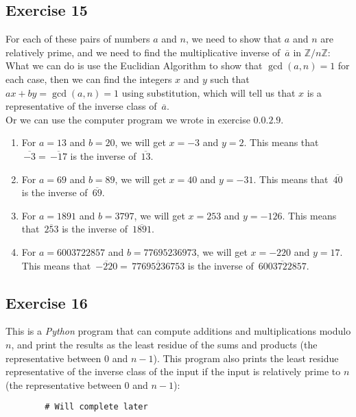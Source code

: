 \documentclass[12pt]{article}
\newcommand{\Z}{\mathbb{Z}}
\newcommand{\olsi}[1]{\,\overline{{#1}}}
\begin{document}
    \subsection*{Exercise 15}
    For each of these pairs of numbers $a$ and $n$,
    we need to show that $a$ and $n$ are relatively prime,
    and we need to find the multiplicative inverse of $\olsi{a}$
    in $\Z/n\Z$: \\
    What we can do is use the Euclidian Algorithm
    to show that $\gcd(a, n) = 1$ for each case,
    then we can find the integers $x$ and $y$
    such that $ax + by = \gcd(a, n) = 1$ using substitution,
    which will tell us that $x$ is a representative of
    the inverse class of $\olsi{a}$. \\
    Or we can use the computer program we wrote in exercise $0.0.2.9$. \\ 
    \begin{enumerate}[label=\textbf{\alph*.}]
        \item 
            For $a = 13$ and $b = 20$,
            we will get $x = -3$ and $y = 2$.
            This means that $\olsi{-3} = \olsi{-17}$
            is the inverse of $\olsi{13}$.
        \item 
            For $a = 69$ and $b = 89$,
            we will get $x = 40$ and $y = -31$.
            This means that $\olsi{40}$
            is the inverse of $\olsi{69}$.
        \item 
            For $a = 1891$ and $b = 3797$,
            we will get $x = 253$ and $y = -126$.
            This means that $\olsi{253}$
            is the inverse of $\olsi{1891}$.
        \item 
            For $a = 6003722857$ and $b = 77695236973$,
            we will get $x = -220$ and $y = 17$.
            This means that $\olsi{-220} = \olsi{77695236753}$
            is the inverse of $\olsi{6003722857}$.
    \end{enumerate}
 
    \subsection*{Exercise 16}
    This is a \textit{Python} program that can compute
    additions and multiplications modulo $n$,
    and print the results as the least residue of
    the sums and products (the representative between $0$ and $n-1$).
    This program also prints the least residue representative
    of the inverse class of the input if the input is relatively
    prime to $n$ (the representative between $0$ and $n-1$):
    \begin{lstlisting}
        # Will complete later
    \end{lstlisting}
\end{document}
